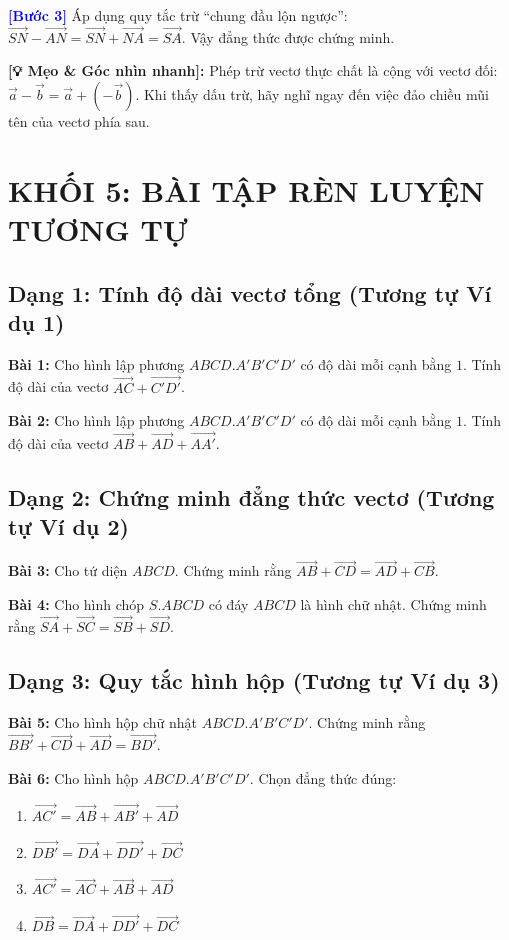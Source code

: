 \documentclass[12pt,a4paper]{article}
\begin{document}
\noindent\textbf{\textcolor{blue}{[Bước 3]}} Áp dụng quy tắc trừ ``chung đầu lộn ngược'': $\vec{SN} - \vec{AN} = \vec{SN} + \vec{NA} = \vec{SA}$.
Vậy đẳng thức được chứng minh.

\noindent\textbf{[💡 Mẹo \& Góc nhìn nhanh]:} Phép trừ vectơ thực chất là cộng với vectơ đối: $\vec{a} - \vec{b} = \vec{a} + (-\vec{b})$. Khi thấy dấu trừ, hãy nghĩ ngay đến việc đảo chiều mũi tên của vectơ phía sau.

\newpage

\section*{KHỐI 5: BÀI TẬP RÈN LUYỆN TƯƠNG TỰ}

\subsection*{Dạng 1: Tính độ dài vectơ tổng (Tương tự Ví dụ 1)}
\textbf{Bài 1:} Cho hình lập phương $ABCD.A'B'C'D'$ có độ dài mỗi cạnh bằng $1$. Tính độ dài của vectơ $\vec{AC} + \vec{C'D'}$.
\vspace{0.2cm}

\textbf{Bài 2:} Cho hình lập phương $ABCD.A'B'C'D'$ có độ dài mỗi cạnh bằng $1$. Tính độ dài của vectơ $\vec{AB} + \vec{AD} + \vec{AA'}$.

\subsection*{Dạng 2: Chứng minh đẳng thức vectơ (Tương tự Ví dụ 2)}
\textbf{Bài 3:} Cho tứ diện $ABCD$. Chứng minh rằng $\vec{AB} + \vec{CD} = \vec{AD} + \vec{CB}$.
\vspace{0.2cm}

\textbf{Bài 4:} Cho hình chóp $S.ABCD$ có đáy $ABCD$ là hình chữ nhật. Chứng minh rằng $\vec{SA} + \vec{SC} = \vec{SB} + \vec{SD}$.

\subsection*{Dạng 3: Quy tắc hình hộp (Tương tự Ví dụ 3)}
\textbf{Bài 5:} Cho hình hộp chữ nhật $ABCD.A'B'C'D'$. Chứng minh rằng $\vec{BB'} + \vec{CD} + \vec{AD} = \vec{BD'}$.
\vspace{0.2cm}

\textbf{Bài 6:} Cho hình hộp $ABCD.A'B'C'D'$. Chọn đẳng thức đúng:
\begin{enumerate}[label=\Alph*.]
    \item $\vec{AC'} = \vec{AB} + \vec{AB'} + \vec{AD}$
    \item $\vec{DB'} = \vec{DA} + \vec{DD'} + \vec{DC}$
    \item $\vec{AC'} = \vec{AC} + \vec{AB} + \vec{AD}$
    \item $\vec{DB} = \vec{DA} + \vec{DD'} + \vec{DC}$
\end{enumerate}
\end{document}
